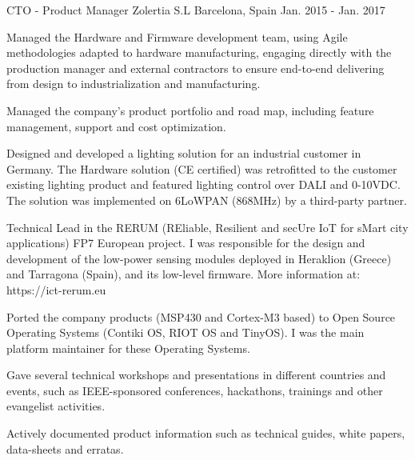 
\begin{cventries}

  \cventry
    {CTO - Product Manager} %
    {Zolertia S.L} %
    {Barcelona, Spain} %
    {Jan. 2015 - Jan. 2017} %
    {
      \begin{cvitems} %
        \item {Managed the Hardware and Firmware development team, using Agile methodologies adapted to hardware manufacturing, engaging directly with the production manager and external contractors to ensure end-to-end delivering from design to industrialization and manufacturing.}
        \item {Managed the company's product portfolio and road map, including feature management, support and cost optimization.}
        \item {Designed and developed a lighting solution for an industrial customer in Germany.  The Hardware solution (CE certified) was retrofitted to the customer existing lighting product and featured lighting control over DALI and 0-10VDC.  The solution was implemented on 6LoWPAN (868MHz) by a third-party partner.}
        \item {Technical Lead in the RERUM (REliable, Resilient and secUre IoT for sMart city applications) FP7 European project.  I was responsible for the design and development of the low-power sensing modules deployed in Heraklion (Greece) and Tarragona (Spain), and its low-level firmware.  More information at: https://ict-rerum.eu}
        \item {Ported the company products (MSP430 and Cortex-M3 based) to Open Source Operating Systems (Contiki OS, RIOT OS and TinyOS). I was the main platform maintainer for these Operating Systems.}
        \item {Gave several technical workshops and presentations in different countries and events, such as IEEE-sponsored conferences, hackathons, trainings and other evangelist activities.}
        \item {Actively documented product information such as technical guides, white papers, data-sheets and erratas.}
      \end{cvitems}
    }


\end{cventries}
